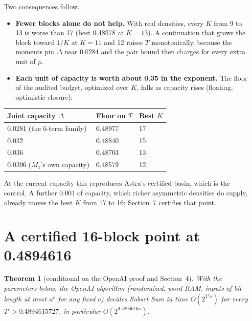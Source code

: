 \documentclass[11pt]{article}
\theoremstyle{plain}
\newtheorem*{theorem*}{Theorem}
\begin{document}
Two consequences follow.

\begin{itemize}
\item \textbf{Fewer blocks alone do not help.} With real densities, every $K$ from 9 to 13 is worse than 17 (best 0.48978 at $K = 13$). A continuation that grows the block toward $1/K$ at $K = 11$ and 12 raises $T$ monotonically, because the moments pin $\Delta$ near 0.0284 and the pair bound then charges for every extra unit of $\mu$.
\item \textbf{Each unit of capacity is worth about 0.35 in the exponent.} The floor of the audited budget, optimized over $K$, falls as capacity rises (floating, optimistic closure):
\end{itemize}

\begin{center}
\small
\begin{tabular}{lll}
\toprule
Joint capacity $\Delta$ & Floor on $T$ & Best $K$ \\
\midrule
0.0281 (the 6-term family) & 0.48977 & 17 \\
0.032 & 0.48840 & 15 \\
0.036 & 0.48703 & 13 \\
0.0396 ($M_1$'s own capacity) & 0.48579 & 12 \\
\bottomrule
\end{tabular}
\end{center}

At the current capacity this reproduces Astra's certified basin, which is the control. A further 0.001 of capacity, which richer asymmetric densities do supply, already moves the best $K$ from 17 to 16; Section~7 certifies that point.

\section{A certified 16-block point at 0.4894616}

\begin{theorem*}[conditional on the OpenAI proof and Section~4]
With the parameters below, the OpenAI algorithm (randomized, word-RAM, inputs of bit length at most $n^c$ for any fixed $c$) decides Subset Sum in time $O(2^{T' n})$ for every $T' > 0.4894615727$, in particular $O(2^{0.4894616 n})$.
\end{theorem*}
\end{document}
